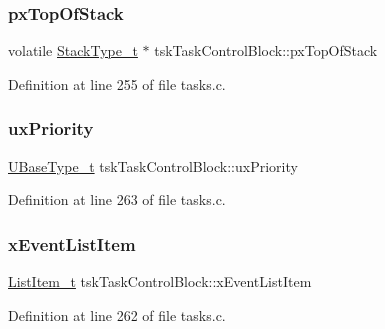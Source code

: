 \subsubsection{\texorpdfstring{px\+Top\+Of\+Stack}{pxTopOfStack}}
{\footnotesize\ttfamily volatile \hyperlink{externals_2freertos_2portable_2_g_c_c_2_a_r_m___c_m0_2portmacro_8h_a84e9a8ba132feed0b2401c1f4e2ac63c}{Stack\+Type\+\_\+t} $\ast$ tsk\+Task\+Control\+Block\+::px\+Top\+Of\+Stack}



Definition at line 255 of file tasks.\+c.

\mbox{\label{structtsk_task_control_block_a79187811e3d2a15595942e3b44237d85}} 
\subsubsection{\texorpdfstring{ux\+Priority}{uxPriority}}
{\footnotesize\ttfamily \hyperlink{externals_2freertos_2portable_2_g_c_c_2_a_r_m___c_m0_2portmacro_8h_a646f89d4298e4f5afd522202b11cb2e6}{U\+Base\+Type\+\_\+t} tsk\+Task\+Control\+Block\+::ux\+Priority}



Definition at line 263 of file tasks.\+c.

\mbox{\label{structtsk_task_control_block_a1a1612b6081a13683808284d93a9b28f}} 
\subsubsection{\texorpdfstring{x\+Event\+List\+Item}{xEventListItem}}
{\footnotesize\ttfamily \hyperlink{externals_2freertos_2include_2list_8h_a1a62d469392f9bfe2443e7efab9c8398}{List\+Item\+\_\+t} tsk\+Task\+Control\+Block\+::x\+Event\+List\+Item}



Definition at line 262 of file tasks.\+c.

\mbox{\label{structtsk_task_control_block_af331a67daadbafd0e66098e8111cfa4b}} 
